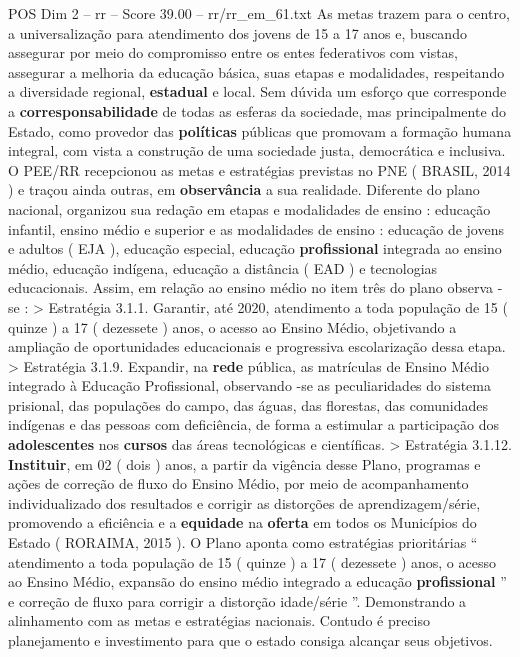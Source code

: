 \begin{textsample}{POS Dim 2 – rr – Score 39.00 – rr/rr\_em\_61.txt}
As metas trazem para o centro, a universalização para atendimento dos jovens de 15 a 17 anos e, buscando assegurar por meio do compromisso entre os entes federativos com vistas, assegurar a melhoria da educação básica, suas etapas e modalidades, respeitando a diversidade regional, \textbf{estadual} e local.
Sem dúvida um esforço que corresponde a \textbf{corresponsabilidade} de todas as esferas da sociedade, mas principalmente do Estado, como provedor das \textbf{políticas} públicas que promovam a formação humana integral, com vista a construção de uma sociedade justa, democrática e inclusiva.
O PEE/RR recepcionou as metas e estratégias previstas no PNE ( BRASIL, 2014 ) e traçou ainda outras, em \textbf{observância} a sua realidade.
Diferente do plano nacional, organizou sua redação em etapas e modalidades de ensino : educação infantil, ensino médio e superior e as modalidades de ensino : educação de jovens e adultos ( EJA ), educação especial, educação \textbf{profissional} integrada ao ensino médio, educação indígena, educação a distância ( EAD ) e tecnologias educacionais.
Assim, em relação ao ensino médio no item três do plano observa -se : > Estratégia 3.1.1.
Garantir, até 2020, atendimento a toda população de 15 ( quinze ) a 17 ( dezessete ) anos, o acesso ao Ensino Médio, objetivando a ampliação de oportunidades educacionais e progressiva escolarização dessa etapa. > Estratégia 3.1.9.
Expandir, na \textbf{rede} pública, as matrículas de Ensino Médio integrado à Educação Profissional, observando -se as peculiaridades do sistema prisional, das populações do campo, das águas, das florestas, das comunidades indígenas e das pessoas com deficiência, de forma a estimular a participação dos \textbf{adolescentes} nos \textbf{cursos} das áreas tecnológicas e científicas. > Estratégia 3.1.12. \textbf{Instituir}, em 02 ( dois ) anos, a partir da vigência desse Plano, programas e ações de correção de fluxo do Ensino Médio, por meio de acompanhamento individualizado dos resultados e corrigir as distorções de aprendizagem/série, promovendo a eficiência e a \textbf{equidade} na \textbf{oferta} em todos os Municípios do Estado ( RORAIMA, 2015 ).
O Plano aponta como estratégias prioritárias “ atendimento a toda população de 15 ( quinze ) a 17 ( dezessete ) anos, o acesso ao Ensino Médio, expansão do ensino médio integrado a educação \textbf{profissional} ” e correção de fluxo para corrigir a distorção idade/série ”.
Demonstrando a alinhamento com as metas e estratégias nacionais.
Contudo é preciso planejamento e investimento para que o estado consiga alcançar seus objetivos.

\end{textsample}
